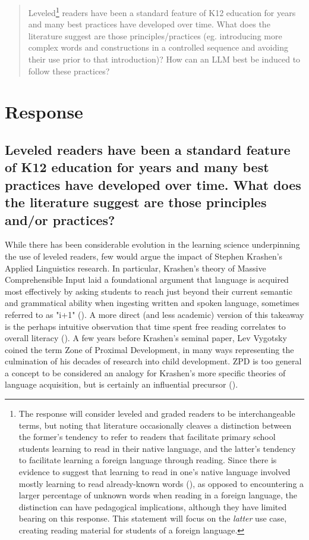 \documentclass[
	letterpaper, %
]{jdf}
\newcommand{\pcite}[1]{(\cite{#1})}
\begin{document}
\blockquote{Leveled\footnote{The response will consider leveled and graded readers to be interchangeable terms, but noting that literature occasionally cleaves a distinction between the former's tendency to refer to readers that facilitate primary school students learning to read in their native language, and the latter's tendency to facilitate learning a foreign language through reading. Since there is evidence to suggest that learning to read in one's native language involved mostly learning to read already-known words \pcite{hu_2000}, as opposed to encountering a larger percentage of unknown words when reading in a foreign language, the distinction can have pedagogical implications, although they have limited bearing on this response. This statement will focus on the \textit{latter} use case, creating reading material for students of a foreign language.} readers have been a standard feature of K12 education for years and many best practices have developed over time.  What does the literature suggest are those principles/practices (eg. introducing more complex words and constructions in a controlled sequence and avoiding their use prior to that introduction)? How can an LLM best be induced to follow these practices?}

\section{Response}

\subsection{Leveled readers have been a standard feature of K12 education for years and many best practices have developed over time.  What does the literature suggest are those principles and/or practices?}

While there has been considerable evolution in the learning science underpinning the use of leveled readers, few would argue the impact of Stephen Krashen's Applied Linguistics research. In particular, Krashen's theory of Massive Comprehensible Input laid a foundational argument that language is acquired most effectively by asking students to reach just beyond their current semantic and grammatical ability when ingesting written and spoken language, sometimes referred to as "i+1" \pcite{krashen1982principles, krashenreview}. A more direct (and less academic) version of this takeaway is the perhaps intuitive observation that time spent free reading correlates to overall literacy \pcite{krashen_2004}. A few years before Krashen's seminal paper, Lev Vygotsky coined the term Zone of Proximal Development, in many ways representing the culmination of his decades of research into child development. ZPD is too general a concept to be considered an analogy for Krashen's more specific theories of language acquisition, but is certainly an influential precursor \pcite{vygotsky, vygostky_krashen_not_same}.
\end{document}
